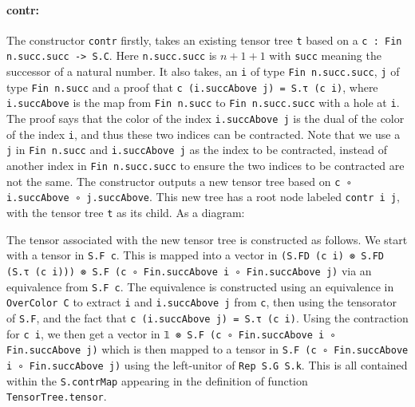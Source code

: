\documentclass[a4paper, 11pt]{article}
\DeclareRobustCommand{\myinline}{\lstinline}
\newcommand{\tensorTree}[1]{
\begin{center}
  \fcolorbox{mycolor}{white}{%
#1}
\end{center}
}
\begin{document}
\paragraph{contr:}
The constructor \myinline|contr| firstly, takes an existing tensor tree \myinline|t| based on a 
\myinline|c : Fin n.succ.succ -> S.C|. Here \myinline|n.succ.succ| is $n + 1 + 1$ with \myinline|succ| meaning 
the successor of a natural number. 
It also takes,
an \myinline|i| of type \myinline|Fin n.succ.succ|, \myinline|j| of type \myinline|Fin n.succ|
and a proof that \myinline|c (i.succAbove j) = S.τ (c i)|, where \myinline|i.succAbove| is the map from \myinline|Fin n.succ| to \myinline|Fin n.succ.succ| with a hole at \myinline|i|. 
The proof says that the color of the index \myinline|i.succAbove j| is the dual of the color of the index \myinline|i|, and thus these 
two indices can be contracted.
Note that we use a \myinline|j| in \myinline|Fin n.succ| and \myinline|i.succAbove j| as the index to be contracted, instead 
of another index in  \myinline|Fin n.succ.succ| to ensure the two indices to be contracted are not the same. 
The constructor outputs a new tensor tree based on \myinline|c ∘ i.succAbove ∘ j.succAbove|. 
This new tree has a root node labeled \myinline|contr i j|, with the tensor tree \myinline|t| as its child.
As a diagram:
\tensorTree{
  \begin{tikzpicture}
    \node[draw=black] (A) at (0,0) {\lstinline|contr i j|};
    \node (B) at (0,-1) {\lstinline|t|};
    \draw[->] (A) -- (B);
  \end{tikzpicture} 
}
The tensor associated with the new tensor tree is constructed as follows. 
We start with a tensor in \myinline|S.F c|.
This is mapped into a vector in \myinline|(S.FD (c i) ⊗ S.FD (S.τ (c i))) ⊗ S.F (c ∘ Fin.succAbove i ∘ Fin.succAbove j)| via an equivalence from 
\myinline|S.F c|. The equivalence is constructed using an equivalence 
in \myinline|OverColor C| to extract \myinline|i| and \myinline|i.succAbove j| from \myinline|c|,
then using the tensorator of \myinline|S.F|, and the fact that \myinline|c (i.succAbove j) = S.τ (c i)|. 
Using the contraction for \myinline|c i|, we then get a vector in 
\myinline|𝟙 ⊗ S.F (c ∘ Fin.succAbove i ∘ Fin.succAbove j)| which is then 
mapped to a tensor in \myinline|S.F (c ∘ Fin.succAbove i ∘ Fin.succAbove j)|
using the left-unitor of \myinline|Rep S.G S.k|.
This is all contained within the \myinline|S.contrMap| appearing in the definition of
function \myinline|TensorTree.tensor|.
\end{document}

